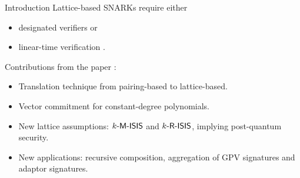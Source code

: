 \begin{frame}{Introduction}
	Lattice-based SNARKs require either 
	\begin{itemize}
		\item designated verifiers \cite{GennaroMNO18, IshaiSW21} or 
		\item linear-time verification \cite{AttemaCK21, BootleCS21}.
	\end{itemize}

	Contributions from the paper \cite{AlbrechtCLMT22}:
	\begin{itemize}
		\item Translation technique from pairing-based to lattice-based.
		\item Vector commitment for constant-degree polynomials.
		\item New lattice assumptions: $k\textsf{-M-ISIS}$ and $k\textsf{-R-ISIS}$, implying post-quantum security.
		\item New applications: recursive composition, aggregation of GPV signatures and adaptor signatures.
	\end{itemize}
\end{frame}